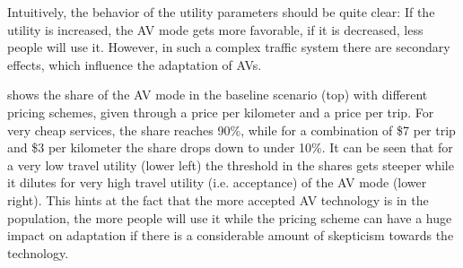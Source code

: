 Intuitively, the behavior of the utility parameters should be quite clear: If
the utility is increased, the AV mode gets more favorable, if it is decreased, less
people will use it. However, in such a complex traffic system there are secondary
effects, which influence the adaptation of AVs.

 shows the share of the AV mode in the baseline scenario (top)
with different pricing schemes, given through a price per kilometer and a price
per trip. For very cheap services, the share reaches 90\%, while for a combination
of \$7 per trip and \$3 per kilometer the share drops down to under 10\%. It can
be seen that for a very low travel utility (lower left) the threshold in the shares
gets steeper while it dilutes for  very high travel utility (i.e. acceptance)
of the AV mode (lower right). This hints at the fact that the more accepted AV
technology is in the population, the more people will use it while the pricing
scheme can have a huge impact on adaptation if there is a considerable amount of
skepticism towards the technology.

